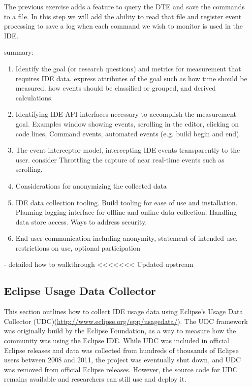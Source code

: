 \begin{Exercise}
The previous exercise adds a feature to query the DTE and save the commands to a file.  In this step we will add the ability to read that file and register event processing to save a log when each command we wish to monitor is used in the IDE.  
\end{Exercise}
 summary:
\begin{enumerate}
	\item 
	Identify the goal (or research questions) and metrics for measurement that requires IDE data.  express attributes of the goal such as how time should be measured, how events should be classified or grouped, and derived calculations.
	\item
	Identifying  IDE API interfaces necessary to accomplish the measurement goal.  Examples window showing events, scrolling in the editor, clicking on code lines, Command events, automated events (e.g. build begin and end).
	\item
	The event interceptor model, intercepting IDE events transparently to the user.  consider Throttling the capture of near real-time events such as scrolling.
	\item
	Considerations for anonymizing the collected data
	\item
	IDE data collection tooling.  Build tooling for ease of use and installation.  Planning logging interface for offline and online data collection.  Handling data store access.  Ways to address security.  
	\item
	End user communication including anonymity, statement of intended use, restrictions on use, optional participation
	
\end{enumerate}
- detailed how to walkthrough 
<<<<<<< Updated upstream

\subsection{Eclipse Usage Data Collector}

This section outlines how to collect IDE usage data using Eclipse's Usage Data Collector (UDC)(\url{http://www.eclipse.org/epp/usagedata/}).
The UDC framework was originally build by the Eclipse Foundation, as a way to measure how the 
community was using the Eclipse IDE.
While UDC was included in official Eclipse releases and data was collected from
hundreds of thousands of Eclipse users between 2008 and 2011, the project was eventually shut down, 
and UDC was removed from official Eclipse releases.
However, the source code for UDC remains available and researchers can still use and deploy it.

